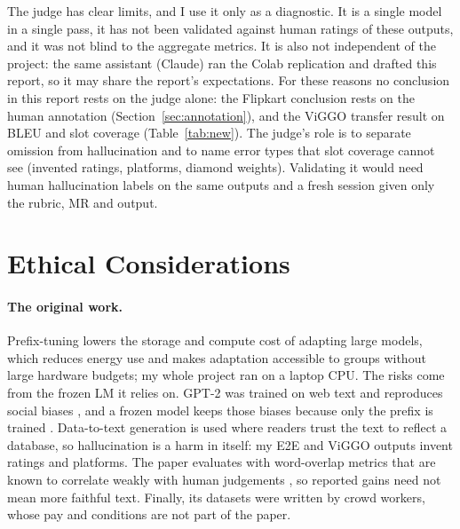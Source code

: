 \documentclass[11pt]{article}
\begin{document}
The judge has clear limits, and I use it only as a diagnostic. It is a single model in a single pass, it has not been validated against human ratings of these outputs, and it was not blind to the aggregate metrics. It is also not independent of the project: the same assistant (Claude) ran the Colab replication and drafted this report, so it may share the report's expectations. For these reasons no conclusion in this report rests on the judge alone: the Flipkart conclusion rests on the human annotation (Section~\ref{sec:annotation}), and the ViGGO transfer result on BLEU and slot coverage (Table~\ref{tab:new}). The judge's role is to separate omission from hallucination and to name error types that slot coverage cannot see (invented ratings, platforms, diamond weights). Validating it would need human hallucination labels on the same outputs and a fresh session given only the rubric, MR and output.

\section{Ethical Considerations}

\paragraph{The original work.} Prefix-tuning lowers the storage and compute cost of adapting large models, which reduces energy use and makes adaptation accessible to groups without large hardware budgets; my whole project ran on a laptop CPU. The risks come from the frozen LM it relies on. GPT-2 was trained on web text and reproduces social biases \citep{sheng-etal-2019-woman}, and a frozen model keeps those biases because only the prefix is trained \citep{bender-etal-2021-parrots}. Data-to-text generation is used where readers trust the text to reflect a database, so hallucination \citep{ji-etal-2023-hallucination} is a harm in itself: my E2E and ViGGO outputs invent ratings and platforms. The paper evaluates with word-overlap metrics that are known to correlate weakly with human judgements \citep{novikova-etal-2017-need}, so reported gains need not mean more faithful text. Finally, its datasets were written by crowd workers, whose pay and conditions are not part of the paper.
\end{document}
